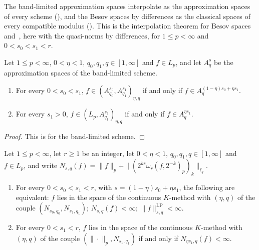 The band-limited approximation spaces interpolate as the approximation spaces of every scheme
(), and the Besov spaces by differences as the
classical spaces of every compatible modulus (). This is
the interpolation theorem for Besov spaces~\cite[Theorem~6.4.5]{BerghLofstrom}
and~\cite[Section~2.4]{TriebelInterpolation}, here with the quasi-norms by differences, for
$1 \leq p < \infty$ and $0 < s_0 < s_1 < r$.

\begin{corollary}
\label{cor:band-approximation-interpolate}
\leanok
{}
Let $1 \leq p < \infty$, $0 < \eta < 1$, $q_0, q_1, q \in [1, \infty]$ and $f \in L_p$, and let
$A^s_q$ be the approximation spaces of the band-limited scheme.
\begin{enumerate}
  \item For every $0 < s_0 < s_1$, $f \in (A^{s_0}_{q_0}, A^{s_1}_{q_1})_{\eta, q}$ if and only
    if $f \in A^{(1-\eta)s_0 + \eta s_1}_q$.
  \item For every $s_1 > 0$, $f \in (L_p, A^{s_1}_{q_1})_{\eta, q}$ if and only if
    $f \in A^{\eta s_1}_q$.
\end{enumerate}
\end{corollary}

\begin{proof}
\leanok
This is  for the band-limited scheme.
\end{proof}

\begin{theorem}
\label{thm:rd-besov-interpolate}
\leanok
{}
Let $1 \leq p < \infty$, let $r \geq 1$ be an integer, let $0 < \eta < 1$,
$q_0, q_1, q \in [1, \infty]$ and $f \in L_p$, and write
$N_{s, q}(f) = \|f\|_p + \|(2^{ks} \omega_r(f, 2^{-k})_p)_k\|_{\ell_q}$.
\begin{enumerate}
  \item For every $0 < s_0 < s_1 < r$, with $s = (1 - \eta) s_0 + \eta s_1$, the following are
    equivalent: $f$ lies in the space of the continuous $K$-method with $(\eta, q)$ of the
    couple $(N_{s_0, q_0}, N_{s_1, q_1})$; $N_{s, q}(f) < \infty$;
    $\|f\|^{\mathrm{LP}}_{s, q} < \infty$.
  \item For every $0 < s_1 < r$, $f$ lies in the space of the continuous $K$-method with
    $(\eta, q)$ of the couple $(\|\cdot\|_p, N_{s_1, q_1})$ if and only if
    $N_{\eta s_1, q}(f) < \infty$.
\end{enumerate}
\end{theorem}


